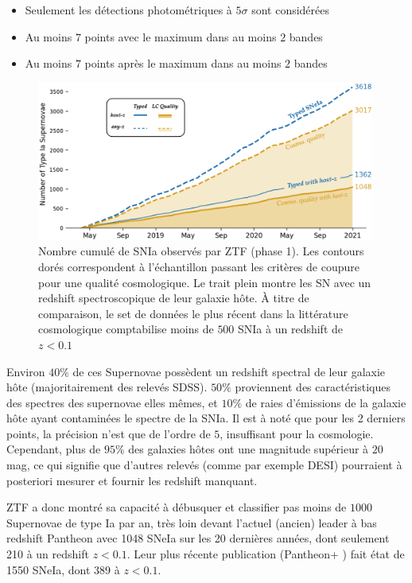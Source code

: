 \documentclass[../main/main.tex]{subfiles}
\begin{document}
\begin{itemize}[label=$\diamondsuit$]
  \itemsep0em 
   \item Seulement les détections photométriques à $5\sigma$ sont
     considérées
   \item Au moins $7$ points avec le maximum dans au moins $2$ bandes
   \item Au moins $7$ points après le maximum dans au moins $2$ bandes
\end{itemize}

\begin{figure}[h]
  \centering
  \includegraphics[width=0.99\textwidth]{../figures/02_ztf/cumulsniaztf.png}
  \caption[Nombre cumulé de SNIa observés par ZTF (phase 1)]{Nombre
    cumulé de SNIa observés par ZTF (phase 1). Les contours dorés
    correspondent à l'échantillon passant les critères de coupure pour
    une qualité cosmologique. Le trait plein montre les SN avec un
    redshift spectroscopique de leur galaxie hôte. À titre de
    comparaison, le set de données le plus récent dans la littérature
    cosmologique comptabilise moins de $500$ SNIa à un redshift de $z<0.1$}
  \label{fig:cumulsniaztf}
\end{figure}

Environ $40\%$ de ces Supernovae possèdent un redshift spectral de leur
galaxie hôte (majoritairement des relevés SDSS). $50\%$ proviennent des
caractéristiques des spectres des supernovae elles mêmes, et $10\%$ de
raies d'émissions de la galaxie hôte ayant contaminées le spectre de la
SNIa. Il est à noté que pour les 2 derniers points, la précision n'est
que de l'ordre de $5$\textperthousand, insuffisant pour la cosmologie.
Cependant, plus de $95\%$ des galaxies hôtes ont une magnitude supérieur
à $20$ mag, ce qui signifie que d'autres relevés (comme par exemple
DESI) pourraient à posteriori mesurer et fournir les redshift manquant.

ZTF a donc montré sa capacité à débusquer et classifier pas moins de
$1000$ Supernovae de type Ia par an, très loin devant l'actuel (ancien)
leader à bas redshift Pantheon \citep{Scolnicpantheon18} avec 1048 SNeIa
sur les 20 dernières années, dont seulement 210 à un redshift
$z<0.1$. Leur plus récente publication (Pantheon+
\citet{Scolnicpantheon21}) fait état de 1550 SNeIa, dont 389 à $z<0.1$.
\end{document}
